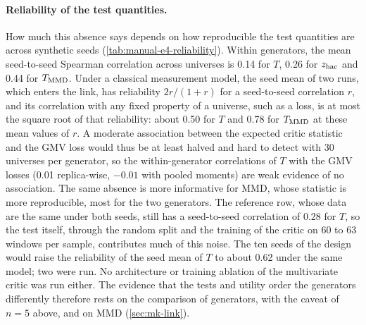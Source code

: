 \paragraph{Reliability of the test quantities.}
How much this absence says depends on how reproducible the test quantities are across synthetic
seeds (\cref{tab:manual-e4-reliability}). Within generators, the mean seed-to-seed Spearman
correlation across universes is 0.14 for $T$, 0.26 for $z_{\mathrm{hac}}$ and 0.44 for $T_{\mathrm{MMD}}$. Under a
classical measurement model, the seed mean of two runs, which enters the link, has reliability
$2r/(1+r)$ for a seed-to-seed correlation $r$, and its correlation with any fixed property of a
universe, such as a loss, is at most the square root of that reliability: about 0.50 for $T$ and
0.78 for $T_{\mathrm{MMD}}$ at these mean values of $r$. A moderate association between the expected critic
statistic and the GMV loss would thus be at least halved and hard to detect with 30 universes
per generator, so the within-generator correlations of $T$ with the GMV losses (0.01
replica-wise, $-0.01$ with pooled moments) are weak evidence of no association. The same absence
is more informative for MMD, whose statistic is more reproducible, most for the two \iid{}
generators. The reference row, whose data are the same under both seeds, still has a
seed-to-seed correlation of 0.28 for $T$, so the test itself, through the random split and the
training of the critic on 60 to 63 windows per sample, contributes much of this noise. The ten
seeds of the design would raise the reliability of the seed mean of $T$ to about 0.62 under the
same model; two were run. No architecture or training ablation of the multivariate critic was
run either. The evidence that the tests and utility order the generators differently therefore
rests on the comparison of generators, with the caveat of $n=5$ above, and on MMD
(\cref{sec:mk-link}).
